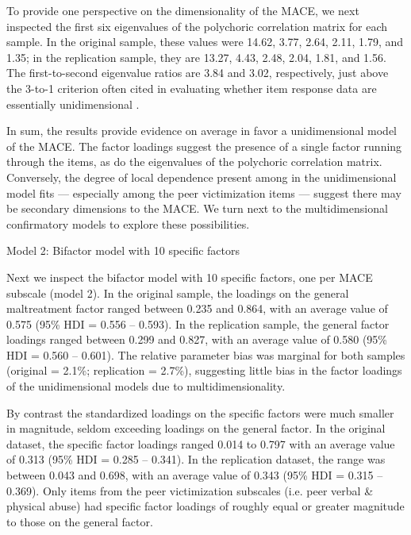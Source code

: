 \documentclass[letterpaper,man,natbib]{apa6}  %
\makeatletter
\renewcommand{\subsubsection}{\@startsection{subsubsection}{3}
  {\z@}%
  {\b@level@two@skip}{\e@level@two@skip}%
  {\normalfont\normalsize\bfseries}}
\makeatother
\begin{document}
To provide one perspective on the dimensionality of the MACE, we next inspected the first six eigenvalues of the polychoric correlation matrix for each sample. In the original sample, these values were 14.62, 3.77, 2.64, 2.11, 1.79, and 1.35; in the replication sample, they are 13.27, 4.43, 2.48, 2.04, 1.81, and 1.56. The first-to-second eigenvalue ratios are 3.84 and 3.02, respectively, just above the 3-to-1 criterion often cited in evaluating whether item response data are essentially unidimensional \citep{embretson2013item}. 

In sum, the results provide evidence on average in favor a unidimensional model of the MACE. The factor loadings suggest the presence of a single factor running through the items, as do the eigenvalues of the polychoric correlation matrix. Conversely, the degree of local dependence present among in the unidimensional model fits --- especially among the peer victimization items --- suggest there may be secondary dimensions to the MACE. We turn next to the multidimensional confirmatory models to explore these possibilities.

\subsubsection{Model 2: Bifactor model with 10 specific factors}

Next we inspect the bifactor model with 10 specific factors, one per MACE subscale (model 2). In the original sample, the loadings on the general maltreatment factor ranged between 0.235 and 0.864, with an average value of 0.575 (95\% HDI = 0.556 -- 0.593). In the replication sample, the general factor loadings ranged between 0.299 and 0.827, with an average value of 0.580 (95\% HDI = 0.560 -- 0.601). The relative parameter bias was marginal for both samples (original = 2.1\%; replication = 2.7\%), suggesting little bias in the factor loadings of the unidimensional models due to multidimensionality.  

By contrast the standardized loadings on the specific factors were much smaller in magnitude, seldom exceeding loadings on the general factor. In the original dataset, the specific factor loadings ranged 0.014 to 0.797 with an average value of 0.313 (95\% HDI = 0.285 -- 0.341). In the replication dataset, the range was between 0.043 and 0.698, with an average value of 0.343 (95\% HDI = 0.315 -- 0.369). Only items from the peer victimization subscales (i.e. peer verbal \& physical abuse) had specific factor loadings of roughly equal or greater magnitude to those on the general factor. 
\end{document}
